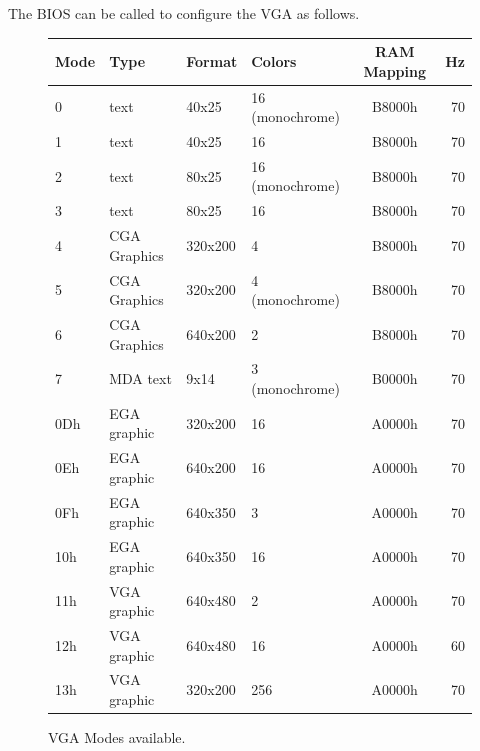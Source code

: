 \documentclass[book.tex]{subfiles}
\begin{document}
The BIOS can be called to configure the VGA as follows.
\vspace{-10pt}
\begin{figure}[H]
\centering
\begin{table}[H]
\begin{tabularx}{\textwidth}[c]{llllcr}
\hline
\textbf{Mode} & \textbf{Type} & \textbf{Format} & \textbf{Colors} & \hspace{10pt}\textbf{RAM Mapping}\hspace{10pt} & \textbf{Hz}        \\ \hline
0             & text          & 40x25           & 16 (monochrome) & B8000h     & 70                           \\ \hline
1             & text          & 40x25           & 16              & B8000h    & 70                            \\ \hline
2             & text          & 80x25           & 16 (monochrome) & B8000h    & 70                            \\ \hline
3             & text          & 80x25           & 16              & B8000h    & 70                            \\ \hline
4             & CGA Graphics  & 320x200         & 4               & B8000h    & 70                            \\ \hline
5             & CGA Graphics  & 320x200         & 4 (monochrome)  & B8000h    & 70                            \\ \hline
6             & CGA Graphics  & 640x200         & 2               & B8000h    & 70                            \\ \hline
7             & MDA text      & 9x14            & 3 (monochrome)  & B0000h    & 70                            \\ \hline
0Dh           & EGA graphic   & 320x200         & 16              & A0000h    & 70                            \\ \hline
0Eh           & EGA graphic   & 640x200         & 16              & A0000h    & 70                            \\ \hline
0Fh           & EGA graphic   & 640x350         & 3               & A0000h    & 70                            \\ \hline
10h           & EGA graphic   & 640x350         & 16              & A0000h    & 70                            \\ \hline
11h           & VGA graphic   & 640x480         & 2               & A0000h    & 70                            \\ \hline
12h           & VGA graphic   & 640x480         & 16              & A0000h    & 60                            \\ \hline
13h           & VGA graphic   & 320x200         & 256             & A0000h    & 70                            \\ \hline
\end{tabularx}
\end{table}
\caption{VGA Modes available.}%
\label{vga-modes-available}
 \end{figure}
 
\end{document}
